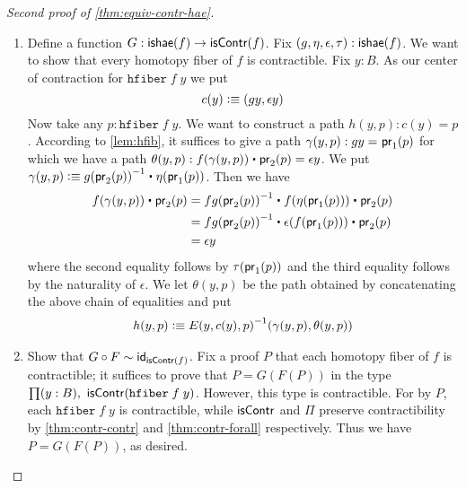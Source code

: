 \begin{proof}[Second proof of \autoref{thm:equiv-contr-hae}]
\begin{enumerate}
\item Define a function $G : \ishae(f) \to \iscontr(f)$. Fix $(g,\eta,\epsilon,\tau): \ishae(f)$. We want to show that every homotopy fiber of $f$ is contractible. Fix $y : B$. As our center of contraction for $\mathtt{hfiber} \; f \;y$ we put 
\[c(y) \defeq (gy, \epsilon y)\]
Now take any $p : \mathtt{hfiber} \; f \;y$. We want to construct a path $h(y,p) : c(y) = p$.
According to \autoref{lem:hfib}, it suffices to give a path $\gamma(y,p) : \id{gy}{\proj{1}(p)}$ for which we have a path $\theta(y,p) : f(\gamma(y,p)) \ct \proj{2}(p) = \epsilon y$. We put $\gamma(y,p) \defeq {\opp{g(\proj{2}(p))}} \ct {\eta (\proj{1}(p))}$.
Then we have 
\begin{align*}
f(\gamma(y,p)) \ct \proj{2}(p) & = \opp{fg(\proj{2}(p))} \ct {f (\eta(\proj{1}(p)))} \ct \proj{2}(p) \\
& = \opp{fg(\proj{2}(p))} \ct {\epsilon(f(\proj{1}(p)))} \ct \proj{2}(p) \\
& = \epsilon y
\end{align*}
where the second equality follows by $\tau(\proj{1}(p))$ and the third equality follows by the naturality of $\epsilon$. We let $\theta(y,p)$ be the path obtained by concatenating the above chain of equalities and put 
\begin{align*}
 h(y,p) \defeq \opp{E(y,c(y),p)} (\gamma(y,p), \theta(y,p))
\end{align*}

\item Show that $G \circ F \sim \idfunc[\iscontr(f)]$. Fix a proof $P$ that each homotopy fiber of $f$ is contractible; it suffices to prove that $P = G(F(P))$ in the type $\prd{y:B} \iscontr (\mathtt{hfiber \;} f \; y)$.
  However, this type is contractible.
  For by $P$, each $\mathtt{hfiber} \; f \; y$ is contractible, while $\iscontr$ and $\Pi$ preserve contractibility by \autoref{thm:contr-contr} and \autoref{thm:contr-forall} respectively.
  Thus we have $P = G(F(P))$, as desired.


\end{enumerate}
\end{proof}
